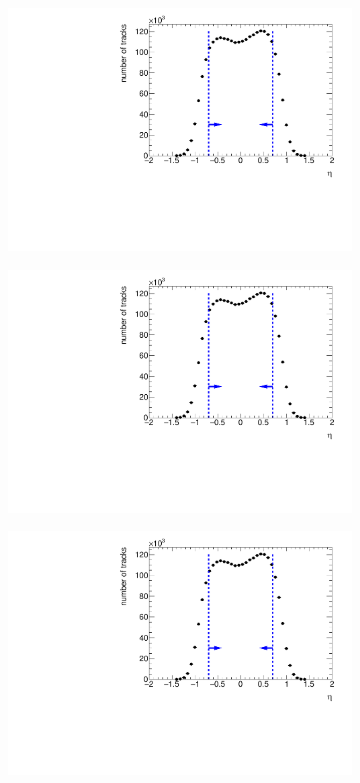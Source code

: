 \begin{figure}[b!]
	\centering
	\begin{subfigure}{.45\textwidth}
		\includegraphics[width=\textwidth, page=8]{chapters/chrgSTAR/img/selection/SDT.pdf}
		\caption{}
	\end{subfigure}
	\begin{subfigure}{.45\textwidth}
		\includegraphics[width=\textwidth, page=7]{chapters/chrgSTAR/img/selection/SDT.pdf}
		\caption{}
	\end{subfigure}
	\begin{subfigure}{.45\textwidth}
		\includegraphics[width=\textwidth, page=3]{chapters/chrgSTAR/img/selection/SDT.pdf}

\end{subfigure}
\end{figure}
